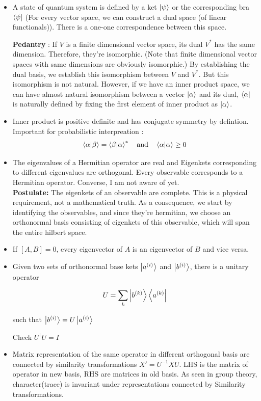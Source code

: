 \documentclass{report}
\begin{document}
\begin{itemize}

  \item A state of quantum system is defined by a ket $\ket{\psi}$ or the corresponding bra $\bra{\psi}$ (For every vector space, we can construct a dual space (of linear functionals)). There is a one-one correspondence between this space.

  \noindent \textbf {Pedantry} : If $V$ is a finite dimensional vector space, its dual $V^*$ has the same dimension. Therefore, they're isomorphic. (Note that finite dimensional vector spaces with same dimensions are obviously isomorphic.) By establishing the dual basis, we establish this isomorphism between $V$ and $V^*$. But this isomorphism is not natural. However, if we have an inner product space, we can have almost natural isomorphism between a vector $\ket{\alpha}$ and its dual, $\bra{\alpha}$ is naturally defined by fixing the first element of inner product as $\ket{\alpha}$.

  \item Inner product is positive definite and has conjugate symmetry by defintion. Important for probabilistic interpreation :
    $$\bra{\alpha}\ket{\beta} = \bra{\beta}\ket{\alpha}^* \quad \textrm{and} \quad \bra{\alpha}\ket{\alpha} \ge 0$$ 

  \item The eigenvalues of a Hermitian operator are real and Eigenkets corresponding to different eigenvalues are orthogonal. Every observable corresponds to a Hermitian operator. Converse, I am not aware of yet. \\

  \textbf{Postulate:} The eigenkets of an observable are complete. This is a physical requirement, not a mathematical truth. As a consequence, we start by identifying the observables, and since they're hermitian, we choose an orthonormal basis consisting of eigenkets of this observable, which will span the entire hilbert space.

\item If $[A,B] = 0$, every eigenvector of $A$ is an eigenvector of $B$ and vice versa.

\item Given two sets of orthonormal base kets ${\ket{a^{(i)}}}$ and ${\ket{b^{(i)}}}$, there is a unitary operator

  $$U = \sum_{k} \ket{b^{(k)}}\bra{a^{(k)}}$$

  such that $\ket{b^{(i)}} = U\ket{a^{(i)}}$

  Check $U^\dag U = I$

\item Matrix representation of the same operator in different orthogonal basis are connected by similarity transformations $X' =U^{-1}XU$. LHS is the matrix of operator in new basis, RHS are matrices in old basis. As seen in group theory, character(trace) is invariant under representations connected by Similarity transformations.

\end{itemize}
\end{document}
